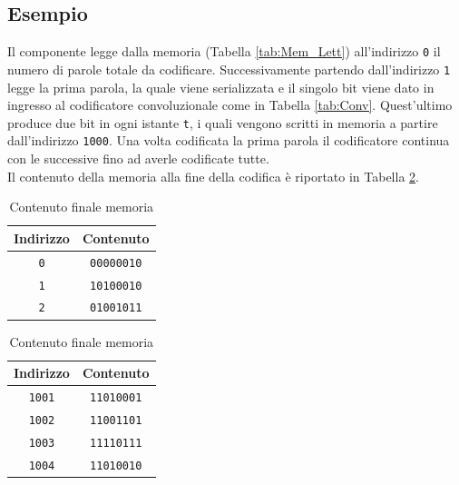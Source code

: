 \documentclass{article}
\begin{document}
\subsection{Esempio}
Il componente legge dalla memoria (Tabella \ref{tab:Mem_Lett}) all’indirizzo \verb|0| il numero di parole totale da codificare. Successivamente partendo dall’indirizzo \verb|1| legge la prima parola, la quale viene serializzata e il singolo bit viene dato in ingresso al codificatore convoluzionale come in Tabella \ref{tab:Conv}. Quest’ultimo produce due bit in ogni istante \verb|t|, i quali vengono scritti in memoria a partire dall’indirizzo \verb|1000|.
Una volta codificata la prima parola il codificatore continua con le successive fino ad averle codificate tutte.\\
Il contenuto della memoria alla fine della codifica è riportato in Tabella \ref{tab:Mem_Scrit}.

\begin{table}[ht]
    \begin{minipage}{0.45\textwidth}
        \centering
        \begin{tabular}{||c|c||}
            \hline
            Indirizzo & Contenuto \\
            \hline
            \verb|0| & \verb|00000010| \\ 
            \verb|1| & \verb|10100010| \\ 
            \verb|2| & \verb|01001011| \\ 
            \hline
        \end{tabular}
        \vspace{5pt}
        \caption{Contenuto iniziale memoria}
        \label{tab:Mem_Lett}
    \end{minipage}
    \hfill
    \begin{minipage}{0.45\textwidth}
        \centering
        \begin{tabular}{||c|c||}
            \hline
            Indirizzo & Contenuto \\
            \hline
            \verb|1001| & \verb|11010001| \\ 
            \verb|1002| & \verb|11001101| \\ 
            \verb|1003| & \verb|11110111| \\ 
            \verb|1004| & \verb|11010010| \\ 
            \hline
        \end{tabular}
        \vspace{5pt}
        \caption{Contenuto finale memoria}
        \label{tab:Mem_Scrit}
    \end{minipage}
\end{table}
\end{document}
